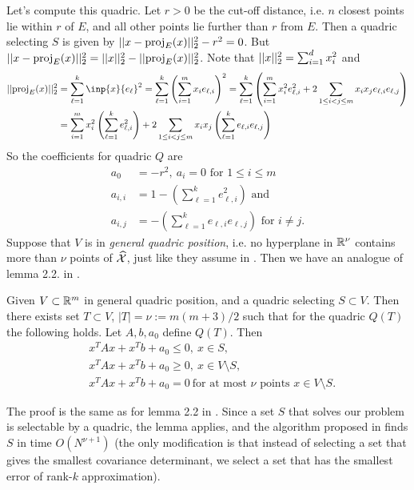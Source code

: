 \documentclass{article}
\begin{document}
Let's compute this quadric. Let $r>0$ be the cut-off distance, i.e. $n$ closest points lie within $r$ of $E$, and all other points lie further than $r$ from $E$. Then a quadric selecting $S$ is given by $||x - \text{proj}_{E}(x)||_2^2 - r^2 = 0$. But $||x - \text{proj}_{E}(x)||_2^2 = ||x||_2^2 - ||\text{proj}_{E}(x)||_2^2$. Note that $||x||_2^2 = \sum_{i=1}^d x_i^2$ and 
\begin{align*}
    \norm{\proj_{E}(x)}_2^2 &= \sum_{\ell=1}^k \inp{x}{e_\ell}^2 = \sum_{\ell=1}^k \left(\sum_{i=1}^m x_i e_{\ell,i}\right)^2 = \sum_{\ell=1}^k \left( \sum_{i=1}^m x_i^2 e_{\ell,i}^2 + 2\sum_{1\leq i < j\leq m} x_ix_j e_{\ell,i}e_{\ell,j} \right)\\
    &= \sum_{i=1}^m x_i^2 \left(\sum_{\ell=1}^k  e_{\ell,i}^2\right) + 2\sum_{1\leq i < j\leq m} x_ix_j \left(\sum_{\ell=1}^k  e_{\ell,i}e_{\ell,j} \right)
\end{align*}
So the coefficients for quadric $Q$ are
\begin{align*}
    a_0 &= -r^2,\ a_i = 0 \text{ for $1\leq i\leq m$}\\
    a_{i,i} &= 1 - \left(\sum_{\ell=1}^k  e_{\ell,i}^2 \right) \text{ and } \\
    a_{i,j} &= - \left(\sum_{\ell=1}^k  e_{\ell,i}e_{\ell,j} \right)\text{ for $i\neq j$}.
\end{align*}
Suppose that $V$ is in \textit{general quadric position}, i.e. no hyperplane in $\mathbb{R}^\nu$ contains more than $\nu$ points of $\widehat{\mathcal{X}}$, just like they assume in \cite{bernholt2004complexity}. Then we have an analogue of lemma 2.2. in \cite{bernholt2004complexity}. 
\begin{lemma}
Given $V\subset \mathbb{R}^m$ in general quadric position, and a quadric selecting $S\subset V$. Then there exists set $T \subset V$, $|T| = \nu := m(m+3)/2$ such that for the quadric $Q(T)$ the following holds. Let $A,b,a_0$ define $Q(T)$. Then
\begin{align*}
    & x^TAx + x^Tb + a_0 \leq 0,\ x\in S,\\
    & x^TAx + x^Tb + a_0 \geq 0,\ x\in V\setminus S,\\
    & x^TAx + x^Tb + a_0 = 0\ \text{for at most $\nu$ points $x\in V\setminus S$}.
\end{align*}
\end{lemma}
The proof is the same as for lemma 2.2 in \cite{bernholt2004complexity}. Since a set $S$ that solves our problem is selectable by a quadric, the lemma applies, and the algorithm proposed in \cite{bernholt2004complexity} finds $S$ in time $O(N^{\nu+1})$ (the only modification is that instead of selecting a set that gives the smallest covariance determinant, we select a set that has the smallest error of rank-$k$ approximation).
\end{document}
